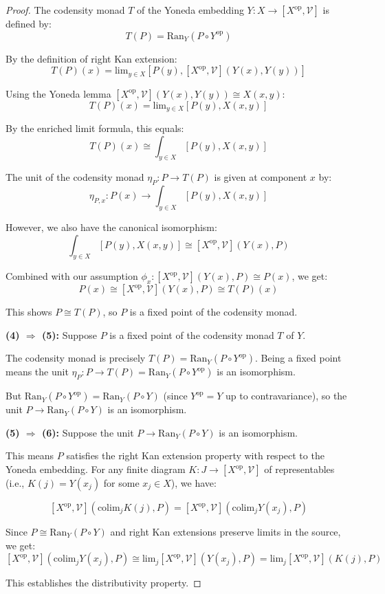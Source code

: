 \documentclass[11pt]{article}
\theoremstyle{plain}
\theoremstyle{definition}
\theoremstyle{remark}
\newcommand{\V}{\mathcal{V}}
\newcommand{\op}{\mathrm{op}}
\newcommand{\colim}{\mathrm{colim}}
\renewcommand{\lim}{\mathrm{lim}}
\begin{document}
\begin{proof}
The codensity monad $T$ of the Yoneda embedding $Y : X \to [X^{\op}, \V]$ is defined by:
$$T(P) = \text{Ran}_Y(P \circ Y^{\op})$$

By the definition of right Kan extension:
$$T(P)(x) = \lim_{y \in X} [P(y), [X^{\op}, \V](Y(x), Y(y))]$$

Using the Yoneda lemma $[X^{\op}, \V](Y(x), Y(y)) \cong X(x, y)$:
$$T(P)(x) = \lim_{y \in X} [P(y), X(x, y)]$$

By the enriched limit formula, this equals:
$$T(P)(x) \cong \int_{y \in X} [P(y), X(x, y)]$$

The unit of the codensity monad $\eta_P : P \to T(P)$ is given at component $x$ by:
$$\eta_{P,x} : P(x) \to \int_{y \in X} [P(y), X(x, y)]$$

However, we also have the canonical isomorphism:
$$\int_{y \in X} [P(y), X(x, y)] \cong [X^{\op}, \V](Y(x), P)$$

Combined with our assumption $\phi_x : [X^{\op}, \V](Y(x), P) \cong P(x)$, we get:
$$P(x) \cong [X^{\op}, \V](Y(x), P) \cong T(P)(x)$$

This shows $P \cong T(P)$, so $P$ is a fixed point of the codensity monad.

\textbf{(4) $\Rightarrow$ (5):}
Suppose $P$ is a fixed point of the codensity monad $T$ of $Y$.

The codensity monad is precisely $T(P) = \text{Ran}_Y(P \circ Y^{\op})$. Being a fixed point means the unit $\eta_P : P \to T(P) = \text{Ran}_Y(P \circ Y^{\op})$ is an isomorphism.

But $\text{Ran}_Y(P \circ Y^{\op}) = \text{Ran}_Y(P \circ Y)$ (since $Y^{\op} = Y$ up to contravariance), so the unit $P \to \text{Ran}_Y(P \circ Y)$ is an isomorphism.

\textbf{(5) $\Rightarrow$ (6):}
Suppose the unit $P \to \text{Ran}_Y(P \circ Y)$ is an isomorphism.

This means $P$ satisfies the right Kan extension property with respect to the Yoneda embedding. For any finite diagram $K : J \to [X^{\op}, \V]$ of representables (i.e., $K(j) = Y(x_j)$ for some $x_j \in X$), we have:

$$[X^{\op}, \V](\colim_j K(j), P) = [X^{\op}, \V](\colim_j Y(x_j), P)$$

Since $P \cong \text{Ran}_Y(P \circ Y)$ and right Kan extensions preserve limits in the source, we get:
$$[X^{\op}, \V](\colim_j Y(x_j), P) \cong \lim_j [X^{\op}, \V](Y(x_j), P) = \lim_j [X^{\op}, \V](K(j), P)$$

This establishes the distributivity property.


\end{proof}
\end{document}
